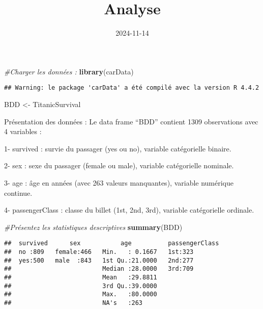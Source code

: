 \documentclass[
]{article}
\title{Analyse}
\author{}
\date{\vspace{-2.5em}2024-11-14}
\newenvironment{Shaded}{\begin{snugshade}}{\end{snugshade}}
\newcommand{\CommentTok}[1]{\textcolor[rgb]{0.56,0.35,0.01}{\textit{#1}}}
\newcommand{\FunctionTok}[1]{\textcolor[rgb]{0.13,0.29,0.53}{\textbf{#1}}}
\newcommand{\NormalTok}[1]{#1}
\newcommand{\OtherTok}[1]{\textcolor[rgb]{0.56,0.35,0.01}{#1}}
\begin{document}
\maketitle

\subsection{}\label{section}

\begin{Shaded}
\begin{Highlighting}[]
\CommentTok{\#Charger les données : }
\FunctionTok{library}\NormalTok{(carData)}
\end{Highlighting}
\end{Shaded}

\begin{verbatim}
## Warning: le package 'carData' a été compilé avec la version R 4.4.2
\end{verbatim}

\begin{Shaded}
\begin{Highlighting}[]
\NormalTok{BDD }\OtherTok{\textless{}{-}}\NormalTok{ TitanicSurvival}
\end{Highlighting}
\end{Shaded}

Présentation des données : Le data frame ``BDD'' contient 1309
observations avec 4 variables :

1- survived : survie du passager (yes ou no), variable catégorielle
binaire.

2- sex : sexe du passager (female ou male), variable catégorielle
nominale.

3- age : âge en années (avec 263 valeurs manquantes), variable numérique
continue.

4- passengerClass : classe du billet (1st, 2nd, 3rd), variable
catégorielle ordinale.

\begin{Shaded}
\begin{Highlighting}[]
\CommentTok{\#Présentez les statistiques descriptives}
\FunctionTok{summary}\NormalTok{(BDD)}
\end{Highlighting}
\end{Shaded}

\begin{verbatim}
##  survived      sex           age          passengerClass
##  no :809   female:466   Min.   : 0.1667   1st:323       
##  yes:500   male  :843   1st Qu.:21.0000   2nd:277       
##                         Median :28.0000   3rd:709       
##                         Mean   :29.8811                 
##                         3rd Qu.:39.0000                 
##                         Max.   :80.0000                 
##                         NA's   :263
\end{verbatim}
\end{document}
